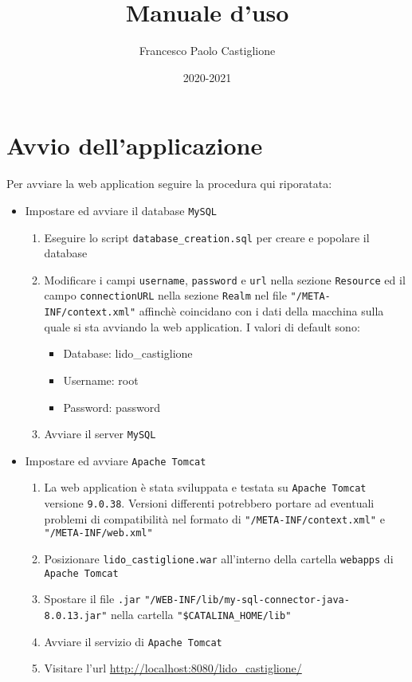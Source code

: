 \documentclass{article}
\title{Manuale d'uso}
\author{Francesco Paolo Castiglione}
\date{2020-2021}
\begin{document}
\maketitle

\tableofcontents
\newpage
\section{Avvio dell'applicazione}

Per avviare la web application seguire la procedura qui riporatata:

\begin{itemize}
	\item Impostare ed avviare il database \texttt{MySQL}
	\begin{enumerate}
		\item Eseguire lo script \texttt{database\_creation.sql} per creare e popolare il database
		\item Modificare i campi \texttt{username}, \texttt{password} e \texttt{url} nella sezione \texttt{Resource} ed il campo \texttt{connectionURL} nella sezione \texttt{Realm} nel file \texttt{"/META-INF/context.xml"} affinchè coincidano con i dati della macchina sulla quale si sta avviando la web application.\newline	
		I valori di default sono:
		\begin{itemize}
			\item Database: lido\_castiglione
			\item Username: root
			\item Password: password
		\end{itemize}
		\item Avviare il server \texttt{MySQL}
	\end{enumerate}
	\item Impostare ed avviare \texttt{Apache Tomcat}
	\begin{enumerate}
		\item La web application è stata sviluppata e testata su \texttt{Apache Tomcat} versione \texttt{9.0.38}. Versioni differenti potrebbero portare ad eventuali problemi di compatibilità nel formato di \texttt{"/META-INF/context.xml"} e \texttt{"/META-INF/web.xml"}
		\item Posizionare \texttt{lido\_castiglione.war} all'interno della cartella \texttt{webapps} di \texttt{Apache Tomcat}
		\item Spostare il file \texttt{.jar} \texttt{"/WEB-INF/lib/my-sql-connector-java-8.0.13.jar"} nella cartella \texttt{"\$CATALINA\_HOME/lib"}
		\item Avviare il servizio di \texttt{Apache Tomcat}
		\item Visitare l'url \url{http://localhost:8080/lido_castiglione/}
	\end{enumerate}
\end{itemize}
\newpage
\end{document}
